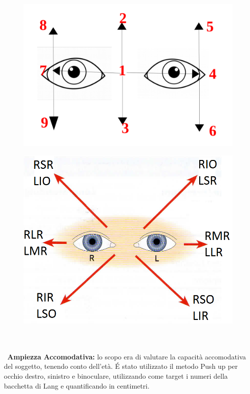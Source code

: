 \begin{figure}[H]
\centering
\begin{minipage}{.5\textwidth}
  \centering
  \includegraphics[scale=0.3]{source/immagini/posizioni_cover_test.png}
  \label{fig:test1}
\end{minipage}%
\begin{minipage}{.5\textwidth}
  \centering
  \includegraphics[scale=0.39]{source/immagini/posizioni_di_sguardo.png}
  \label{fig:test2}
\end{minipage}
\end{figure}
\\\ \\\
\textbf{Ampiezza Accomodativa:} lo scopo era di valutare la capacità accomodativa del soggetto, tenendo conto dell’età. É stato
utilizzato il metodo Push up per occhio destro, sinistro e binoculare, utilizzando come target i numeri della bacchetta di
Lang e quantificando in centimetri.

